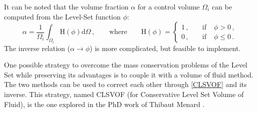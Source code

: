 \documentclass[11pt, a4paper, oneside, openany]{book}
\begin{document}
It can be noted that the volume fraction $\alpha$ for a control volume $\Omega_{i}$ can be computed from the Level-Set function $\phi$:
\begin{equation}
	\alpha=\dfrac{1}{\Omega_{i}}\int_{\Omega_{i}}\mathrm{H}\left(\phi\right)\mathrm{d}\Omega\,,\qquad\mathrm{where}\qquad\mathrm{H}\left(\phi\right)=\left\{\begin{array}{rccl}
	1\,,&\;&\mathrm{if}\;&\phi>0\,,\\
	0\,,&\;&\mathrm{if}\;&\phi\leq 0\,.
	\end{array}\right.\label{CLSVOF}
\end{equation}
The inverse relation ($\alpha\rightarrow\phi$) is more complicated, but feasible to implement.\par
One possible strategy to overcome the mass conservation problems of the Level Set while preserving its advantages is to couple it with a volume of fluid method. The two methods can be used to correct each other through \eqref{CLSVOF} and its inverse. This strategy, named CLSVOF (for Conservative Level Set Volume of Fluid), is the one explored in the PhD work of Thibaut Menard \cite{Menard2007}. 
\end{document}

